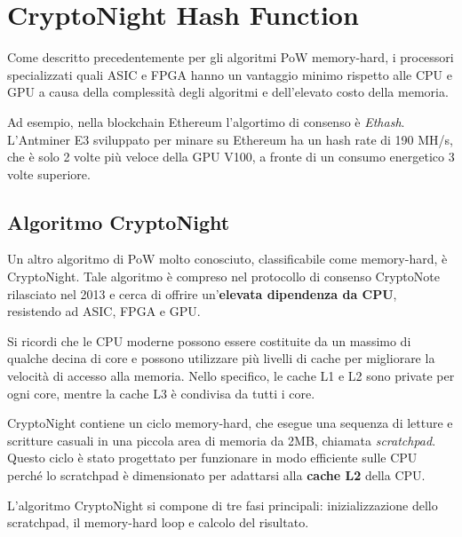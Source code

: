 \section{CryptoNight Hash Function}
Come descritto precedentemente per gli algoritmi PoW memory-hard, i processori specializzati quali ASIC e FPGA hanno un vantaggio minimo rispetto alle CPU e GPU a causa della complessità degli algoritmi e dell'elevato costo della memoria. 

Ad esempio, nella blockchain Ethereum l'algortimo di consenso è \textit{Ethash}. L'Antminer E3 sviluppato per minare su Ethereum ha un hash rate di 190 MH/s, che è solo 2 volte più veloce della GPU V100, a fronte di un consumo energetico 3 volte superiore.

\subsection{Algoritmo CryptoNight}
Un altro algoritmo di PoW molto conosciuto, classificabile come memory-hard, è CryptoNight. 
Tale algoritmo è compreso nel protocollo di consenso CryptoNote rilasciato nel 2013 e cerca di offrire un'\textbf{elevata dipendenza da CPU}, resistendo ad ASIC, FPGA e GPU.

Si ricordi che le CPU moderne possono essere costituite da un massimo di qualche decina di core e possono utilizzare più livelli di cache per migliorare la velocità di accesso alla memoria. 
Nello specifico, le cache L1 e L2 sono private per ogni core, mentre la cache L3 è condivisa da tutti i core. 

CryptoNight contiene un ciclo memory-hard, che esegue una sequenza di letture e scritture casuali in una piccola area di memoria da 2MB, chiamata \textit{scratchpad}. 
Questo ciclo è stato progettato per funzionare in modo efficiente sulle CPU perché lo scratchpad è dimensionato per adattarsi alla \textbf{cache L2} della CPU. 

L'algoritmo CryptoNight si compone di tre fasi principali: inizializzazione dello scratchpad, il memory-hard loop e calcolo del risultato.

